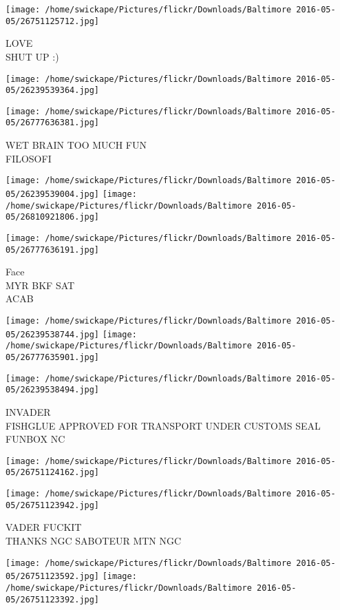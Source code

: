 \documentclass[10pt,letterpaper]{article}
\begin{document}
\vspace{0.25in}
\texttt{[image: /home/swickape/Pictures/flickr/Downloads/Baltimore 2016-05-05/26751125712.jpg]}

LOVE\\
SHUT UP :)
\pagebreak

\texttt{[image: /home/swickape/Pictures/flickr/Downloads/Baltimore 2016-05-05/26239539364.jpg]}

\vspace{0.25in}
\texttt{[image: /home/swickape/Pictures/flickr/Downloads/Baltimore 2016-05-05/26777636381.jpg]}

WET BRAIN TOO MUCH FUN\\
FILOSOFI
\pagebreak

\texttt{[image: /home/swickape/Pictures/flickr/Downloads/Baltimore 2016-05-05/26239539004.jpg]}
\texttt{[image: /home/swickape/Pictures/flickr/Downloads/Baltimore 2016-05-05/26810921806.jpg]}

\vspace{0.25in}
\texttt{[image: /home/swickape/Pictures/flickr/Downloads/Baltimore 2016-05-05/26777636191.jpg]}

Face\\
MYR BKF SAT\\
ACAB
\pagebreak

\texttt{[image: /home/swickape/Pictures/flickr/Downloads/Baltimore 2016-05-05/26239538744.jpg]}
\texttt{[image: /home/swickape/Pictures/flickr/Downloads/Baltimore 2016-05-05/26777635901.jpg]}

\texttt{[image: /home/swickape/Pictures/flickr/Downloads/Baltimore 2016-05-05/26239538494.jpg]}

INVADER\\
FISHGLUE APPROVED FOR TRANSPORT UNDER CUSTOMS SEAL\\
FUNBOX NC
\pagebreak

\texttt{[image: /home/swickape/Pictures/flickr/Downloads/Baltimore 2016-05-05/26751124162.jpg]}

\vspace{0.25in}
\texttt{[image: /home/swickape/Pictures/flickr/Downloads/Baltimore 2016-05-05/26751123942.jpg]}

VADER FUCKIT\\
THANKS NGC SABOTEUR MTN NGC
\pagebreak

\texttt{[image: /home/swickape/Pictures/flickr/Downloads/Baltimore 2016-05-05/26751123592.jpg]}
\texttt{[image: /home/swickape/Pictures/flickr/Downloads/Baltimore 2016-05-05/26751123392.jpg]}
\end{document}
